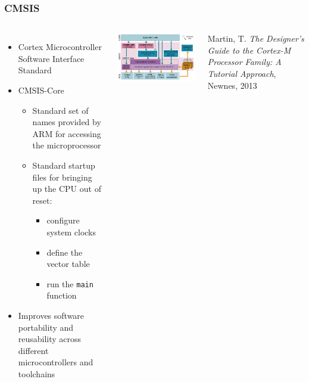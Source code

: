 \documentclass[hyperref={pdfpagelabels=false},svgnames]{beamer}
\begin{document}
\begin{frame}[fragile]
\frametitle{CMSIS}
\begin{columns}
\begin{itemize}
\item Cortex Microcontroller Software Interface Standard
\item CMSIS-Core
\begin{itemize}
\item Standard set of names provided by ARM for accessing
the microprocessor
\item Standard startup files for bringing up the CPU out of reset:
\begin{itemize}
\item configure system clocks
\item define the vector table
\item run the \verb'main' function
\end{itemize}
\end{itemize}
\item Improves software portability and reusability across
different microcontrollers and toolchains
\end{itemize}
\includegraphics[width=\textwidth]{cmsis}
\par
\begin{tiny}
Martin, T. \emph{The Designer's Guide to the Cortex-M Processor Family: A Tutorial Approach}, Newnes, 2013
\end{tiny}
\end{columns}
\end{frame}
\end{document}
